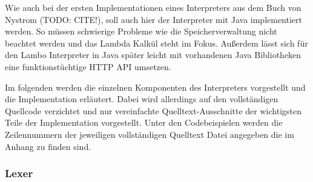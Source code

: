 \documentclass[ngerman]{article}
\begin{document}
Wie auch bei der ersten Implementationen eines Interpreters aus dem Buch von Nystrom (TODO: CITE!), soll auch hier der Interpreter mit Java implementiert werden. So müssen schwierige Probleme wie die Speicherverwaltung nicht beachtet werden und das Lambda Kalkül steht im Fokus. Außerdem lässt sich für den Lambo Interpreter in Java später leicht mit vorhandenen Java Bibliotheken eine funktionstüchtige HTTP API umsetzen.

Im folgenden werden die einzelnen Komponenten des Interpreters vorgestellt und die Implementation erläutert. Dabei wird allerdings auf den vollständigen Quellcode verzichtet und nur vereinfachte Quelltext-Ausschnitte der wichtigsten Teile der Implementation vorgestellt. Unter den Codebeispielen werden die Zeilennummern der jeweiligen vollständigen Quelltext Datei angegeben die im Anhang zu finden sind.

\subsubsection{Lexer}
\end{document}
